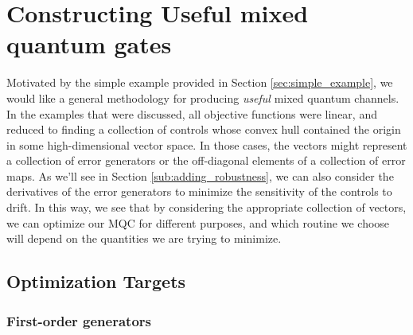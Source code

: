 \documentclass[aps,nofootinbib,pra,notitlepage,twocolumn]{revtex4-1}
\begin{document}
\section{Constructing Useful mixed quantum gates}
\label{sec:mixed_unitary_processes}
Motivated by the simple example provided in Section \ref{sec:simple_example}, we would like a general methodology for producing \textit{useful} mixed quantum channels. In the examples that were discussed, all objective functions were linear, and reduced to finding a collection of controls whose convex hull contained the origin in some high-dimensional vector space. In those cases, the vectors might represent a collection of error generators or the off-diagonal elements of a collection of error maps. As we'll see in Section \ref{sub:adding_robustness}, we can also consider the derivatives of the error generators to minimize the sensitivity of the controls to drift. In this way, we see that by considering the appropriate collection of vectors, we can optimize our MQC for different purposes, and which routine we choose will depend on the quantities we are trying to minimize.

\subsection{Optimization Targets}
\subsubsection{First-order generators} %
\label{sub:first_order_generators}
\end{document}
